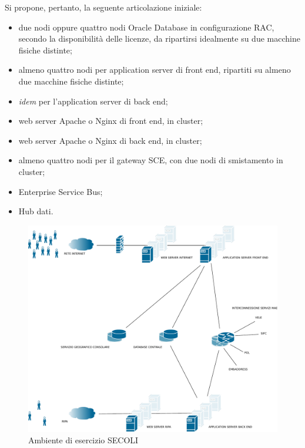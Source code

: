 \documentclass[headinclude,footinclude,a4paper,11pt,final]{scrreprt}
\begin{document}
Si propone, pertanto, la seguente articolazione iniziale:
\begin{itemize}
\item due nodi oppure quattro nodi Oracle Database in configurazione RAC, secondo la disponibilità delle licenze, da ripartirsi idealmente su due macchine fisiche distinte;
\item almeno quattro nodi per application server di front end, ripartiti su almeno due macchine fisiche distinte;
\item \emph{idem} per l'application server di back end;
\item web server Apache o Nginx di front end, in cluster;
\item web server Apache o Nginx di back end, in cluster;
\item almeno quattro nodi per il gateway SCE, con due nodi di smistamento in cluster;
\item Enterprise Service Bus;
\item Hub dati.
\end{itemize}

\begin{figure}[ht]
\includegraphics[scale=0.45]{esercizio.pdf}
\bigskip
\caption{Ambiente di esercizio SECOLI}
\bigskip
\bigskip
\end{figure}
\end{document}
